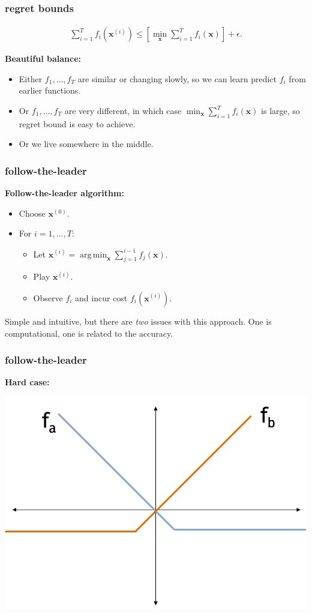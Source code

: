 \documentclass[compress]{beamer}
\newcommand{\bv}[1]{\mathbf{#1}}
\DeclareMathOperator*{\argmin}{arg\,min}
\begin{document}
\begin{frame}[t]
	\frametitle{regret bounds}
	\begin{align*}
		\sum_{i=1}^T f_i(\bv{x}^{(i)}) \leq \left[\min_\bv{x} \sum_{i=1}^T f_i(\bv{x})\right] + \epsilon.
	\end{align*}
	
	\textbf{Beautiful balance:}
	\begin{itemize}
		\item Either $f_1, \ldots, f_T$ are similar or changing slowly, so we can learn predict $f_i$ from earlier functions.
		\item Or $f_1, \ldots, f_T$  are very different, in which case $\min_\bv{x} \sum_{i=1}^T f_i(\bv{x})$ is large, so regret bound is easy to achieve. 
		\item Or we live somewhere in the middle.
	\end{itemize} 
\end{frame}

\begin{frame}[t]
	\frametitle{follow-the-leader}
		\textbf{Follow-the-leader algorithm:}
	\begin{itemize}
		\item Choose $\bv{x}^{(0)}$.
		\item For $i = 1,\ldots, T$:
		\begin{itemize}
			\item Let $\bv{x}^{(i)} = \argmin_{\bv{x}} \sum_{j=1}^{i-1} f_j(\bv{x})$.
			\item Play $\bv{x}^{(i)}$.
			\item Observe $f_{i}$ and incur cost $f_{i}(\bv{x}^{(i)})$. 
		\end{itemize}
	\end{itemize}
Simple and intuitive, but there are \emph{two} issues with this approach. One is computational, one is related to the accuracy.
	
\end{frame}

\begin{frame}[t]
	\frametitle{follow-the-leader}
	\textbf{Hard case:}
\begin{center}
	\includegraphics[width=.7\textwidth]{hard_case_ftl.png}
	\end{center}
\end{frame}
\end{document}
